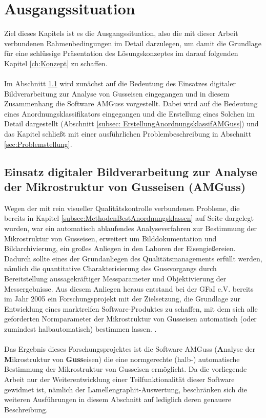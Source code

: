 \documentclass[
fontsize=10pt, 
listof = totoc,
parskip = half	
]{report}
\begin{document}
\chapter{Ausgangssituation}
\label{ch:Ausgangssituation}
Ziel dieses Kapitels ist es die Ausgangssituation, also die mit dieser Arbeit verbundenen Rahmenbedingungen im Detail darzulegen, um damit die Grundlage für eine schlüssige Präsentation des Lösungskonzeptes im darauf folgenden Kapitel \ref{ch:Konzept} zu schaffen.
\\\\
Im Abschnitt \ref{sec:BestimmungMikrostrukturAMGuss} wird zunächst auf die Bedeutung des Einsatzes digitaler Bildverarbeitung zur Analyse von Gusseisen eingegangen und in diesem Zusammenhang die Software AMGuss vorgestellt. Dabei wird auf die Bedeutung eines Anordnungsklassifikators eingegangen und die Erstellung eines Solchen im Detail dargestellt (Abschnitt \ref{subsec: ErstellungAnordnungsklassifAMGuss}) und das Kapitel schließt mit einer ausführlichen Problembeschreibung in Abschnitt \ref{sec:Problemstellung}.

\section{Einsatz digitaler Bildverarbeitung zur Analyse der Mikrostruktur von Gusseisen (AMGuss)}
\label{sec:BestimmungMikrostrukturAMGuss}
Wegen der mit rein visueller Qualitätskontrolle verbundenen Probleme, die bereits in Kapitel \ref{subsec:MethodenBestAnordnungsklassen} auf Seite \pageref{subsec:MethodenBestAnordnungsklassen} dargelegt wurden, war ein automatisch ablaufendes Analyseverfahren zur Bestimmung der Mikrostruktur von Gusseisen, erweitert um Bilddokumentation und Bildarchivierung, ein großes Anliegen in den Laboren der Eisengießereien. Dadurch sollte eines der Grundanliegen des Qualitätsmanagements erfüllt werden, nämlich die quantitative Charakterisierung des Gussvorgangs durch Bereitstellung aussagekräftiger Messparameter und Objektivierung der Messergebnisse. Aus diesem Anliegen heraus entstand bei der GFaI e.V. bereits im Jahr 2005 ein Forschungsprojekt mit der Zielsetzung, die Grundlage zur Entwicklung eines marktreifen Software-Produktes zu schaffen, mit dem sich alle geforderten Normparameter der Mikrostruktur von Gusseisen automatisch (oder zumindest halbautomatisch) bestimmen lassen. \cite{AMGuss2007}.
\\\\
Das Ergebnis dieses Forschungsprojektes ist die Software AMGuss (\textbf{A}nalyse der \textbf{M}ikrostruktur von \textbf{Guss}eisen) die eine normgerechte (halb-) automatische Bestimmung der Mikrostruktur von Gusseisen ermöglicht. Da die vorliegende Arbeit nur der Weiterentwicklung einer Teilfunktionalität dieser Software gewidmet ist, nämlich der Lamellengraphit-Auswertung, beschränken sich die weiteren Ausführungen in diesem Abschnitt auf lediglich deren genauere Beschreibung. 
\end{document}
